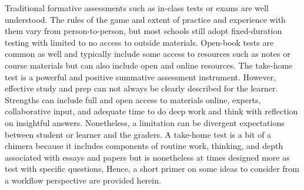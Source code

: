 \documentclass[
]{book}
\begin{document}
Traditional formative assessments such as in-class tests or exams are well understood. The rules of the game and extent of practice and experience with them vary from person-to-person, but most schools still adopt fixed-duration testing with limited to no access to outside materials. Open-book tests are common as well and typically include some access to resources such as notes or course materials but can also include open and online resources. The take-home test is a powerful and positive summative assessment instrument. However, effective study and prep can not always be clearly described for the learner. Strengths can include full and open access to materials online, experts, collaborative input, and adequate time to do deep work and think with reflection on insightful answers. Nonetheless, a limitation can be divergent expectations between student or learner and the graders. A take-home test is a bit of a chimera because it includes components of routine work, thinking, and depth associated with essays and papers but is nonetheless at times designed more as test with specific questions, Hence, a short primer on some ideas to consider from a workflow perspective are provided herein.
\end{document}
